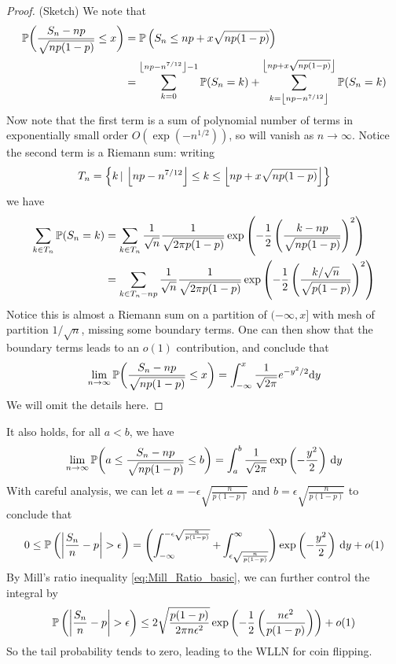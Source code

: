 \begin{proof}
(Sketch) We note that
\begin{align*}
    \mathbb{P} \bigg(\frac{S_n - np}{\sqrt{np(1-p)}} \le x \bigg) 
    &= \mathbb{P}\left( S_n \leq np+x\sqrt{np(1-p)} \right) \\ 
    &= \sum_{k=0}^{\left\lfloor np-n^{7/12} \right\rfloor-1} \mathbb{P}(S_n = k) + \sum_{k=\left\lfloor np-n^{7/12} \right\rfloor}^{\left\lfloor np+x\sqrt{np(1-p)} \right\rfloor} \mathbb{P}(S_n = k)
\end{align*}
Now note that the first term is a sum of polynomial number of terms in exponentially small order $O(\exp{(-n^{1/2})})$, so will vanish as $n \to \infty$. Notice the second term is a Riemann sum: writing $$T_n = \left\{ k \,|\, \left\lfloor np-n^{7/12} \right\rfloor \leq k \leq \left\lfloor np+x\sqrt{np(1-p)} \right\rfloor \right \}$$ 
we have 
\begin{align*}
    \sum_{k\in T_n} \mathbb{P}(S_n = k) &= \sum_{k\in T_n} \frac{1}{\sqrt{n}} \frac{1}{\sqrt{2 \pi p (1-p)}} \exp\left( -\frac{1}{2} \left( \frac{k-np}{\sqrt{np(1-p)}} \right)^2 \right) \\
    &= \sum_{k\in T_n-np} \frac{1}{\sqrt{n}} \frac{1}{\sqrt{2 \pi p (1-p)}} \exp\left( -\frac{1}{2} \left( \frac{k/\sqrt{n}}{\sqrt{p(1-p)}} \right)^2 \right)
\end{align*}
Notice this is almost a Riemann sum on a partition of $(-\infty,x]$ with mesh of partition $1/\sqrt{n}$, missing some boundary terms. One can then show that the boundary terms leads to an $o(1)$ contribution, and conclude that
\begin{equation}
    \lim_{n \rightarrow \infty} \mathbb{P} \bigg(\frac{S_n - np}{\sqrt{np(1-p)}} \le x \bigg) = \int_{-\infty}^x \frac{1}{\sqrt{2 \pi}} e^{-y^2/2} \mathrm{d} y
\end{equation}
We will omit the details here.
\end{proof}

\begin{remark}
It also holds, for all $a < b$, we have
\begin{equation}
    \lim_{n \rightarrow \infty} \mathbb{P} \bigg(a \leq \frac{S_n - np}{\sqrt{np(1-p)}} \leq b \bigg) = \int_a^b \frac{1}{\sqrt{2 \pi}} \exp\left( -\frac{y^2}{2} \right) \, \mathrm{d} y
\end{equation}
With careful analysis, we can let $\displaystyle{a = - \epsilon \sqrt{\frac{n}{p(1-p)}}}$ and $\displaystyle{b = \epsilon \sqrt{\frac{n}{p(1-p)}}}$ to conclude that
\begin{equation}
    0 \leq \mathbb{P}\left( \left| \frac{S_n}{n} - p \right| > \epsilon \right) = \left( \int_{-\infty}^{- \epsilon \sqrt{\frac{n}{p(1-p)}}} + \int_{\epsilon \sqrt{\frac{n}{p(1-p)}}}^{\infty} \right) \exp\left( -\frac{y^2}{2} \right) \, \mathrm{d} y + o(1)
\end{equation}
By Mill's ratio inequality \eqref{eq:Mill_Ratio_basic}, we can further control the integral by
\begin{equation}
    \mathbb{P}\left( \left| \frac{S_n}{n} - p \right| > \epsilon \right) \leq 2 \sqrt{\frac{p(1-p)}{2\pi n\epsilon^2}} \exp\left( -\frac{1}{2} \left( \frac{n\epsilon^2}{p(1-p)} \right) \right) + o(1)
\end{equation}
So the tail probability tends to zero, leading to the WLLN for coin flipping.
\end{remark}

